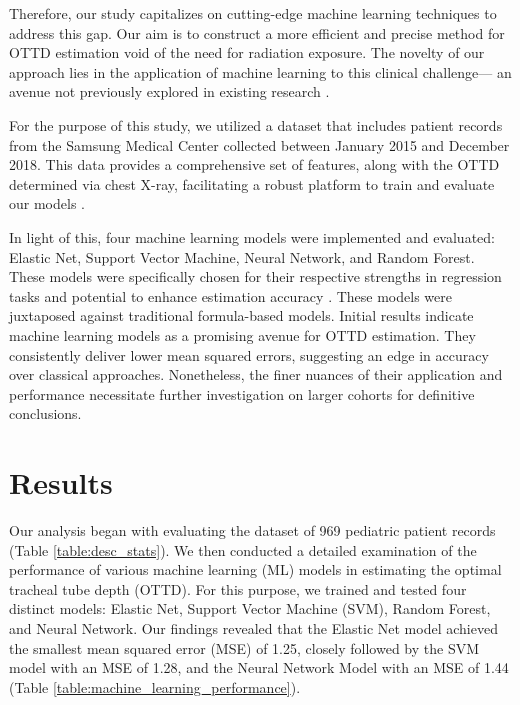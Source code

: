 \documentclass[11pt]{article}
\begin{document}
Therefore, our study capitalizes on cutting-edge machine learning techniques to address this gap. Our aim is to construct a more efficient and precise method for OTTD estimation void of the need for radiation exposure. The novelty of our approach lies in the application of machine learning to this clinical challenge— an avenue not previously explored in existing research \cite{Ingelse2017EarlyFO, Dial2001PediatricSF}.

For the purpose of this study, we utilized a dataset that includes patient records from the Samsung Medical Center collected between January 2015 and December 2018. This data provides a comprehensive set of features, along with the OTTD determined via chest X-ray, facilitating a robust platform to train and evaluate our models \cite{Ingelse2017EarlyFO, Dial2001PediatricSF}.

In light of this, four machine learning models were implemented and evaluated: Elastic Net, Support Vector Machine, Neural Network, and Random Forest. These models were specifically chosen for their respective strengths in regression tasks and potential to enhance estimation accuracy \cite{Dunn2020BenchmarkingMP, Huang2023Photonics, Raczko2017ComparisonOS}. These models were juxtaposed against traditional formula-based models. Initial results indicate machine learning models as a promising avenue for OTTD estimation. They consistently deliver lower mean squared errors, suggesting an edge in accuracy over classical approaches. Nonetheless, the finer nuances of their application and performance necessitate further investigation on larger cohorts for definitive conclusions.

\section*{Results}

Our analysis began with evaluating the dataset of 969 pediatric patient records (Table {}\ref{table:desc_stats}). We then conducted a detailed examination of the performance of various machine learning (ML) models in estimating the optimal tracheal tube depth (OTTD). For this purpose, we trained and tested four distinct models: Elastic Net, Support Vector Machine (SVM), Random Forest, and Neural Network. Our findings revealed that the Elastic Net model achieved the smallest mean squared error (MSE) of 1.25, closely followed by the SVM model with an MSE of 1.28, and the Neural Network Model with an MSE of 1.44 (Table {}\ref{table:machine_learning_performance}).
\end{document}
